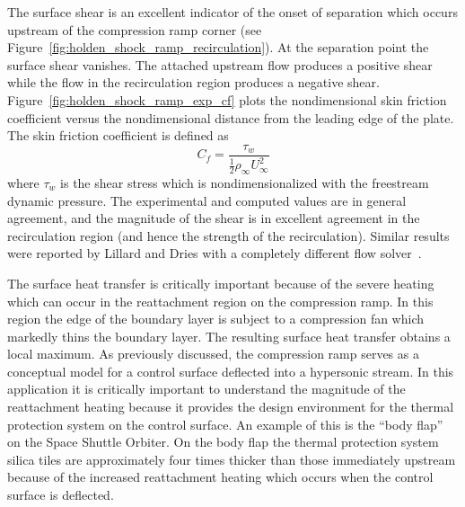 The surface shear is an excellent indicator of the onset of separation which occurs upstream of the compression ramp corner (see Figure~\ref{fig:holden_shock_ramp_recirculation}).  At the separation point the surface shear vanishes.  The attached upstream flow produces a positive shear while the flow in the recirculation region produces a negative shear. Figure~\ref{fig:holden_shock_ramp_exp_cf} plots the nondimensional skin friction coefficient versus the nondimensional distance from the leading edge of the plate.  The skin friction coefficient is defined as
\begin{equation}
  C_f = \frac{\tau_w}{\frac{1}{2} \rho_\infty U_\infty^2}
\end{equation}
where $\tau_w$ is the shear stress which is nondimensionalized with the freestream dynamic pressure.  The experimental and computed values are in general agreement, and the magnitude of the shear is in excellent agreement in the recirculation region (and hence the strength of the recirculation).  Similar results were reported by Lillard and Dries with a completely different flow solver~\cite{lillard_overflow_heating}.

The surface heat transfer is critically important because of the severe heating which can occur in the reattachment region on the compression ramp.  In this region the edge of the boundary layer is subject to a compression fan which markedly thins the boundary layer.  The resulting surface heat transfer obtains a local maximum.  As previously discussed, the compression ramp serves as a conceptual model for a control surface deflected into a hypersonic stream.  In this application it is critically important to understand the magnitude of the reattachment heating because it provides the design environment for the thermal protection system on the control surface.  An example of this is the ``body flap'' on the Space Shuttle Orbiter.  On the body flap the thermal protection system silica tiles are approximately four times thicker than those immediately upstream because of the increased reattachment heating which occurs when the control surface is deflected.

